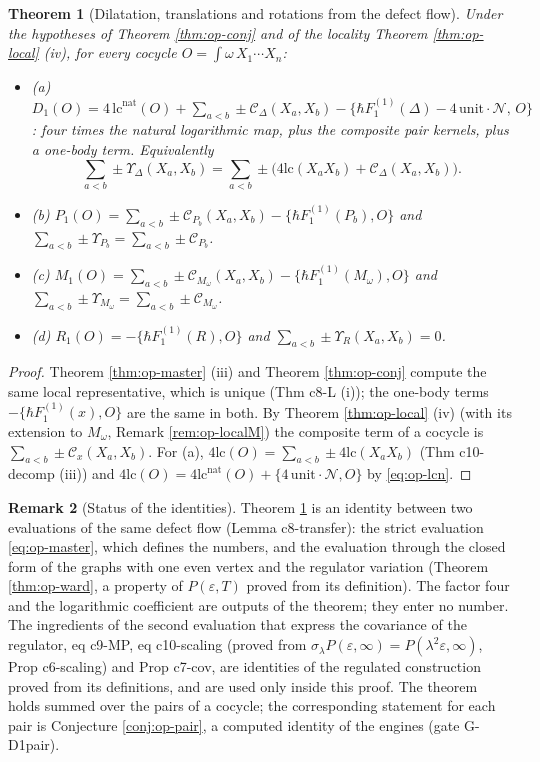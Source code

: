 \documentclass[11pt]{article}
\numberwithin{equation}{section}
\theoremstyle{plain}
\newtheorem{theorem}{Theorem}[section]
\theoremstyle{definition}
\newtheorem{remark}[theorem]{Remark}
\newcommand{\lc}{\mathrm{lc}}
\newcommand{\lcn}{\mathrm{lc}^{\mathrm{nat}}}
\newcommand{\Fc}{\mathcal N}
\newcommand{\Comp}{\mathcal C}
\begin{document}
\begin{theorem}[Dilatation, translations and rotations from the defect flow]
\label{thm:op-a}
Under the hypotheses of Theorem \ref{thm:op-conj} and of the locality Theorem \ref{thm:op-local} (iv), for every cocycle $O=\int\omega\,X_1\cdots X_n$:
\begin{itemize}
\item (a) $D_1(O)=4\,\lcn(O)+\sum_{a<b}\pm\Comp_\Delta(X_a,X_b)-\big\{\hbar F_1^{(1)}(\Delta)-4\,\mathrm{unit}\cdot\Fc,\,O\big\}$: four times the natural logarithmic map, plus the composite pair kernels, plus a one-body term. Equivalently
\begin{equation}
\sum_{a<b}\pm\Upsilon_\Delta(X_a,X_b)=\sum_{a<b}\pm\Big(4\lc(X_aX_b)+\Comp_\Delta(X_a,X_b)\Big).
\label{eq:op-aD}
\end{equation}
\item (b) $P_1(O)=\sum_{a<b}\pm\Comp_{P_b}(X_a,X_b)-\{\hbar F_1^{(1)}(P_b),O\}$ and $\sum_{a<b}\pm\Upsilon_{P_b}=\sum_{a<b}\pm\Comp_{P_b}$.
\item (c) $M_1(O)=\sum_{a<b}\pm\Comp_{M_\omega}(X_a,X_b)-\{\hbar F_1^{(1)}(M_\omega),O\}$ and $\sum_{a<b}\pm\Upsilon_{M_\omega}=\sum_{a<b}\pm\Comp_{M_\omega}$.
\item (d) $R_1(O)=-\{\hbar F_1^{(1)}(R),O\}$ and $\sum_{a<b}\pm\Upsilon_R(X_a,X_b)=0$.
\end{itemize}
\end{theorem}

\begin{proof}
Theorem \ref{thm:op-master} (iii) and Theorem \ref{thm:op-conj} compute the same local representative, which is unique (Thm c8-L (i)); the one-body terms $-\{\hbar F_1^{(1)}(x),O\}$ are the same in both. By Theorem \ref{thm:op-local} (iv) (with its extension to $M_\omega$, Remark \ref{rem:op-localM}) the composite term of a cocycle is $\sum_{a<b}\pm\Comp_x(X_a,X_b)$. For (a), $4\lc(O)=\sum_{a<b}\pm4\lc(X_aX_b)$ (Thm c10-decomp (iii)) and $4\lc(O)=4\lcn(O)+\{4\,\mathrm{unit}\cdot\Fc,O\}$ by \eqref{eq:op-lcn}.
\end{proof}

\begin{remark}[Status of the identities]
\label{rem:op-astatus}
Theorem \ref{thm:op-a} is an identity between two evaluations of the same defect flow (Lemma c8-transfer): the strict evaluation \eqref{eq:op-master}, which defines the numbers, and the evaluation through the closed form of the graphs with one even vertex and the regulator variation (Theorem \ref{thm:op-ward}, a property of $P(\varepsilon,T)$ proved from its definition). The factor four and the logarithmic coefficient are outputs of the theorem; they enter no number. The ingredients of the second evaluation that express the covariance of the regulator, eq c9-MP, eq c10-scaling (proved from $\sigma_\lambda P(\varepsilon,\infty)=P(\lambda^2\varepsilon,\infty)$, Prop c6-scaling) and Prop c7-cov, are identities of the regulated construction proved from its definitions, and are used only inside this proof. The theorem holds summed over the pairs of a cocycle; the corresponding statement for each pair is Conjecture \ref{conj:op-pair}, a computed identity of the engines (gate G-D1pair).
\end{remark}
\end{document}

